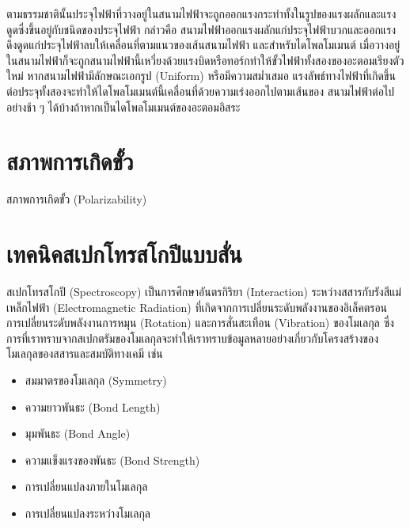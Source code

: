 ตามธรรมชาตินั้นประจุไฟฟ้าที่วางอยู่ในสนามไฟฟ้าจะถูกออกแรงกระทำทั้งในรูปของแรงผลักและแรงดูดซึ่งขึ้นอยู่กับชนิดของประจุไฟฟ้า กล่าวคือ%
สนามไฟฟ้าออกแรงผลักแก่ประจุไฟฟ้าบวกและออกแรงดึงดูดแก่ประจุไฟฟ้าลบให้เคลื่อนที่ตามแนวของเส้นสนามไฟฟ้า และสําหรับไดโพลโมเมนต์%
เมื่อวางอยู่ในสนามไฟฟ้าก็จะถูกสนามไฟฟ้านี้เหวี่ยงด้วยแรงบิดหรือทอร์กทําให้ขั้วไฟฟ้าทั้งสองของอะตอมเรียงตัวใหม่ หากสนามไฟฟ้ามีลักษณะเอกรูป 
(Uniform) หรือมีความสม่ำเสมอ แรงลัพธ์ทางไฟฟ้าที่เกิดขึ้นต่อประจุทั้งสองจะทําให้ไดโพลโมเมนต์นี้เคลื่อนที่ด้วยความเร่งออกไปตามเส้นของ%
สนามไฟฟ้าต่อไปอย่างช้า ๆ ได้บ้างถ้าหากเป็นไดโพลโมเมนต์ของอะตอมอิสระ

\section{สภาพการเกิดขั้ว}
\label{sec:polariz}

สภาพการเกิดขั้ว (Polarizability)

\section{เทคนิคสเปกโทรสโกปีแบบสั่น}
\label{sec:spectro}

สเปกโทรสโกปี (Spectroscopy) เป็นการศึกษาอันตรกิริยา (Interaction) ระหว่างสสารกับรังสีแม่เหล็กไฟฟ้า (Electromagnetic Radiation) 
ที่เกิดจากการเปลี่ยนระดับพลังงานของอิเล็คตรอน การเปลี่ยนระดับพลังงานการหมุน (Rotation) และการสั่นสะเทือน (Vibration) ของโมเลกุล 
ซึ่งการที่เราทราบจากสเปกตรัมของโมเลกุลจะทำให้เราทราบข้อมูลหลายอย่างเกี่ยวกับโครงสร้างของโมเลกุลของสสารและสมบัติทางเคมี เช่น

\begin{itemize}
    \item สมมาตรของโมเลกุล (Symmetry)
    
    \item ความยาวพันธะ (Bond Length)
    
    \item มุมพันธะ (Bond Angle)
    
    \item ความแข็งแรงของพันธะ (Bond Strength)
    
    \item การเปลี่ยนแปลงภายในโมเลกุล
    
    \item การเปลี่ยนแปลงระหว่างโมเลกุล
\end{itemize}

